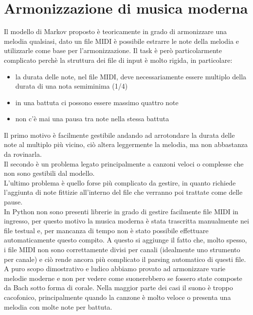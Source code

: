 \section{Armonizzazione di musica moderna}
Il modello di Markov proposto è teoricamente in grado di armonizzare una melodia qualsiasi, dato un file MIDI è possibile estrarre le note della melodia e utilizzarle come base per l'armonizzazione. Il task è però particolarmente complicato perchè la struttura dei file di input è molto rigida, in particolare:
\begin{itemize}
\item la durata delle note, nel file MIDI, deve necessariamente essere multiplo della durata di una nota semiminima (1/4)
\item in una battuta ci possono essere massimo quattro note
\item non c'è mai una pausa tra note nella stessa battuta
\end{itemize} 
Il primo motivo è facilmente gestibile andando ad arrotondare la durata delle note al multiplo più vicino, ciò altera leggermente la melodia, ma non abbastanza da rovinarla.\\
Il secondo è un problema legato principalmente a canzoni veloci o complesse che non sono gestibili dal modello. \\
L'ultimo problema è quello forse più complicato da gestire, in quanto richiede l'aggiunta di note fittizie all'interno del file che verranno poi trattate come delle pause.\\
In Python non sono presenti librerie in grado di gestire facilmente file MIDI in ingresso, per questo motivo la musica moderna è stata trascritta manualmente nei file testual e, per mancanza di tempo non è stato possibile effettuare automaticamente questo compito.
A questo si aggiunge il fatto che, molto spesso, i file MIDI non sono correttamente divisi per canali (idealmente uno strumento per canale) e ciò rende ancora più complicato il parsing automatico di questi file.\\
A puro scopo dimostrativo e ludico abbiamo provato ad armonizzare varie melodie moderne e non per vedere come suonerebbero se fossero state composte da Bach sotto forma di corale.
Nella maggior parte dei casi il suono è troppo cacofonico, principalmente quando la canzone è molto veloce o presenta una melodia con molte note per battuta.
